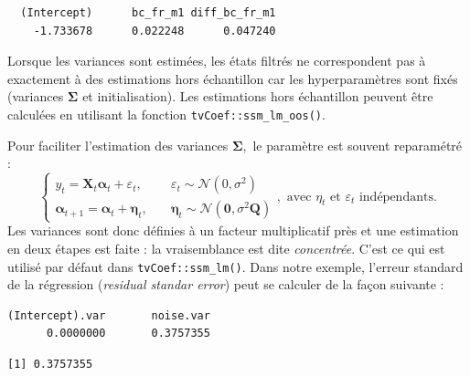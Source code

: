 \documentclass[
  a4paper,
  DIV=11,
  numbers=noendperiod,
  french]{scrartcl}
\newenvironment{Shaded}{\begin{snugshade}}{\end{snugshade}}
\newcommand{\FunctionTok}[1]{\textcolor[rgb]{0.28,0.35,0.67}{#1}}
\newcommand{\NormalTok}[1]{\textcolor[rgb]{0.00,0.23,0.31}{#1}}
\newcommand{\SpecialCharTok}[1]{\textcolor[rgb]{0.37,0.37,0.37}{#1}}
\newcommand\1{{\mathds 1}}
\newcommand{\bf}[1]{{\boldsymbol #1}}
\theoremstyle{remark}
\begin{document}
\begin{verbatim}
  (Intercept)      bc_fr_m1 diff_bc_fr_m1 
    -1.733678      0.022248      0.047240 
\end{verbatim}

Lorsque les variances sont estimées, les états filtrés ne correspondent
pas à exactement à des estimations hors échantillon car les
hyperparamètres sont fixés (variances \(\bf\Sigma\) et initialisation).
Les estimations hors échantillon peuvent être calculées en utilisant la
fonction \texttt{tvCoef::ssm\_lm\_oos()}.

Pour faciliter l'estimation des variances \(\bf\Sigma,\) le paramètre
est souvent reparamétré : \[
\begin{cases}
y_t={\bf X_t}\bf\alpha_t+\varepsilon_t,\quad&\varepsilon_t\sim\mathcal N(0,\sigma^2)\\
\bf\alpha_{t+1}=\bf\alpha_t+\bf\eta_t,\quad&\bf\eta_t\sim\mathcal N(\bf 0,\sigma^2\bf Q)
\end{cases},\text{ avec }\eta_t\text{ et }\varepsilon_t\text{ indépendants.}
\] Les variances sont donc définies à un facteur multiplicatif près et
une estimation en deux étapes est faite : la vraisemblance est dite
\emph{concentrée}. C'est ce qui est utilisé par défaut dans
\texttt{tvCoef::ssm\_lm()}. Dans notre exemple, l'erreur standard de la
régression (\emph{residual standar error}) peut se calculer de la façon
suivante :

\begin{Shaded}
\end{Shaded}

\begin{verbatim}
(Intercept).var       noise.var 
      0.0000000       0.3757355 
\end{verbatim}

\begin{Shaded}
\end{Shaded}

\begin{verbatim}
[1] 0.3757355
\end{verbatim}
\end{document}
